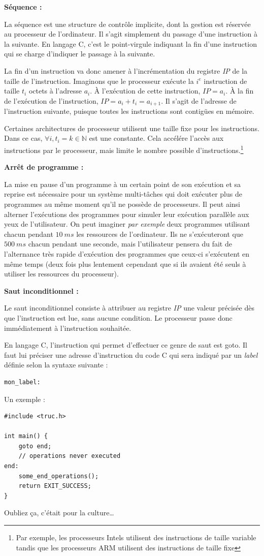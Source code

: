 \documentclass[../../../main.tex]{subfiles}
\begin{document}
\textbf{Séquence :}
 
La séquence est une structure de contrôle implicite, dont la gestion est réservée au processeur de l'ordinateur. Il s'agit simplement du passage d'une instruction à la suivante. En langage C, c'est le point-virgule indiquant la fin d'une instruction qui se charge d'indiquer le passage à la suivante.
 
La fin d'un instruction va donc amener à l'incrémentation du registre \textit{IP} de la taille de l'instruction. Imaginons que le processeur exécute la $i^e$ instruction de taille $t_{i}$ octets à l'adresse $a_{i}$. À l'exécution de cette instruction, $IP = a_{i}$. À la fin de l'exécution de l'instruction, $\textit{IP} = a_{i} + t_{i} = a_{i+1}$. Il s'agit de l'adresse de l'instruction suivante, puisque toutes les instructions sont contigües en mémoire.
 
Certaines architectures de processeur utilisent une taille fixe pour les instructions. Dans ce cas, $\forall{i}, t_{i} = k\in{\mathbb{N}}$ est une constante. Cela accélére l'accès aux instructions par le processeur, mais limite le nombre possible d'instructions.\footnote{Par exemple, les processeurs Intels utilisent des instructions de taille variable tandis que les processeurs ARM utilisent des instructions de taille fixe}
 
\textbf{Arrêt de programme :}
 
La mise en pause d'un programme à un certain point de son exécution et sa reprise est nécessaire pour un système multi-tâches qui doit exécuter plus de programmes au même moment qu'il ne possède de processeurs. Il peut ainsi alterner l'exécutions des programmes pour simuler leur exécution parallèle aux yeux de l'utilisateur. On peut imaginer \textit{par exemple} deux programmes utilisant chacun pendant $10\ ms$ les ressources de l'ordinateur. Ils ne s'exécuteront que $500\ ms$ chacun pendant une seconde, mais l'utilisateur pensera du fait de l'alternance très rapide d'exécution des programmes que ceux-ci s'exécutent en même temps (deux fois plus lentement cependant que si ils avaient été seuls à utiliser les ressources du processeur).
 
\textbf{Saut inconditionnel :}
 
Le saut inconditionnel consiste à attribuer au registre \textit{IP} une valeur précisée dès que l'instruction est lue, sans aucune condition. Le processeur passe donc immédiatement à l'instruction souhaitée.
 
En langage C, l'instruction qui permet d'effectuer ce genre de saut est \textsf{goto}. Il faut lui préciser une adresse d'instruction du code C qui sera indiqué par un \textit{label} définie selon la syntaxe suivante :
\begin{verbatim}
mon_label:
\end{verbatim}
Un exemple :
\begin{verbatim}
#include <truc.h>

int main() {
	goto end;
	// operations never executed
end:
	some_end_operations();
	return EXIT_SUCCESS;
}
\end{verbatim}
Oubliez ça, c'était pour la culture\dots
 
\end{document}
